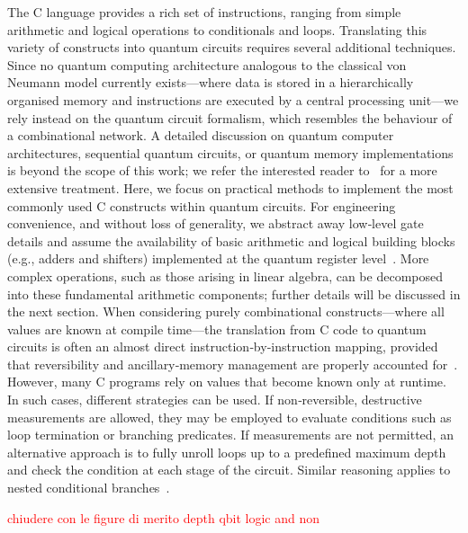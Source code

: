 The C language provides a rich set of instructions, ranging from simple arithmetic and logical operations to conditionals and loops. Translating this variety of constructs into quantum circuits requires several additional techniques. Since no quantum computing architecture analogous to the classical von Neumann model currently exists—where data is stored in a hierarchically organised memory and instructions are executed by a central processing unit—we rely instead on the quantum circuit formalism, which resembles the behaviour of a combinational network.
A detailed discussion on quantum computer architectures, sequential quantum circuits, or quantum memory implementations is beyond the scope of this work; we refer the interested reader to~\cite{} for a more extensive treatment. Here, we focus on practical methods to implement the most commonly used C constructs within quantum circuits.
For engineering convenience, and without loss of generality, we abstract away low‑level gate details and assume the availability of basic arithmetic and logical building blocks (e.g., adders and shifters) implemented at the quantum register level~\cite{quantumc}. More complex operations, such as those arising in linear algebra, can be decomposed into these fundamental arithmetic components; further details will be discussed in the next section.
When considering purely combinational constructs—where all values are known at compile time—the translation from C code to quantum circuits is often an almost direct instruction‑by‑instruction mapping, provided that reversibility and ancillary‑memory management are properly accounted for~\cite{}. However, many C programs rely on values that become known only at runtime. In such cases, different strategies can be used. If non‑reversible, destructive measurements are allowed, they may be employed to evaluate conditions such as loop termination or branching predicates. If measurements are not permitted, an alternative approach is to fully unroll loops up to a predefined maximum depth and check the condition at each stage of the circuit. Similar reasoning applies to nested conditional branches~\cite{quantumc}.

\textcolor{red}{chiudere con le figure di merito depth qbit logic and non }




